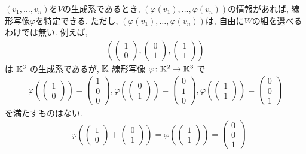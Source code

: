 \begin{remark}
  $(v_1,\ldots,v_n)$を$V$の生成系であるとき,
  $(\varphi(v_1),\ldots,\varphi(v_n))$の情報があれば,
  線形写像$\varphi$を特定できる.
  ただし,
  $(\varphi(v_1),\ldots,\varphi(v_n))$は,
  自由に$W$の組を選べるわけでは無い.
  例えば,
  \begin{align*}
  (
  \begin{pmatrix}1\\0\end{pmatrix},
  \begin{pmatrix}0\\1\end{pmatrix},
  \begin{pmatrix}1\\1\end{pmatrix}
  )
  \end{align*}
  は
  $\mathbb{K}^3$
  の生成系であるが,
  $\mathbb{K}$-線形写像
  $\varphi\colon \mathbb{K}^2\to\mathbb{K}^3$
  で
  \begin{align*}
  \varphi(\begin{pmatrix}1\\0\end{pmatrix})=\begin{pmatrix}1\\0\\0\end{pmatrix},
  \varphi(\begin{pmatrix}0\\1\end{pmatrix})=\begin{pmatrix}0\\1\\0\end{pmatrix},
  \varphi(\begin{pmatrix}1\\1\end{pmatrix})=\begin{pmatrix}0\\0\\1\end{pmatrix}
  \end{align*}
  を満たすものはない.
  \begin{align*}
  &\varphi(\begin{pmatrix}1\\0\end{pmatrix}+\begin{pmatrix}0\\1\end{pmatrix})=\varphi(\begin{pmatrix}1\\1\end{pmatrix})=\begin{pmatrix}0\\0\\1\end{pmatrix}

\end{align*}
\end{remark}
